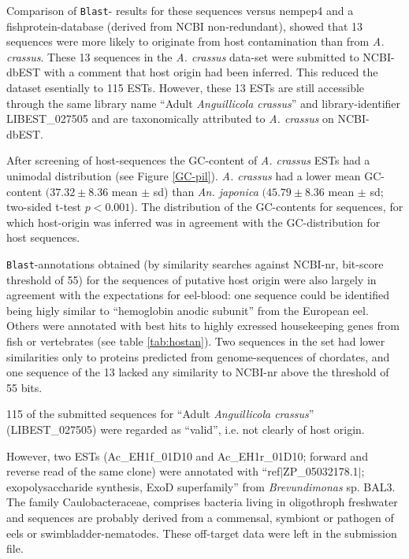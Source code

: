 Comparison of \texttt{Blast}- results for these sequences versus
nempep4 and a fishprotein-database (derived from NCBI non-redundant),
showed that 13 sequences were more likely to originate from host
contamination than from \textit{A. crassus}. These 13 sequences in the
\textit{A. crassus} data-set were submitted to NCBI-dbEST with a
comment that host origin had been inferred. This reduced the dataset
esentially to 115 ESTs. However, these 13 ESTs are still accessible
through the same library name ``Adult \textit{Anguillicola crassus}''
and library-identifier LIBEST\_027505 and are taxonomically attributed
to \textit{A. crassus} on NCBI-dbEST.


After screening of host-sequences the GC-content of
\textit{A. crassus} ESTs had a unimodal distribution (see Figure
\ref{GC-pil}). \textit{A. crassus} had a lower mean GC-content $(37.32
\pm 8.36$ mean $\pm$ sd) than \textit{An. japonica} $(45.79 \pm
8.36$ mean $\pm$ sd; two-sided t-test $p<0.001$). The distribution of
the GC-contents for sequences, for which host-origin was inferred was
in agreement with the GC-distribution for host sequences.

\texttt{Blast}-annotations obtained (by similarity searches against
NCBI-nr, bit-score threshold of 55) for the sequences of putative host
origin were also largely in agreement with the expectations for
eel-blood: one sequence could be identified being higly similar to
``hemoglobin anodic subunit'' from the European eel. Others were
annotated with best hits to highly exressed housekeeping genes from
fish or vertebrates (see table \ref{tab:hostan}). Two sequences in the
set had lower similarities only to proteins predicted from
genome-sequences of chordates, and one sequence of the 13 lacked any
similarity to NCBI-nr above the threshold of 55 bits.

115 of the submitted sequences for ``Adult \textit{Anguillicola
  crassus}'' (LIBEST\_027505) were regarded as ``valid'', i.e. not
clearly of host origin.

However, two ESTs (Ac\_EH1f\_01D10 and Ac\_EH1r\_01D10; forward and
reverse read of the same clone) were annotated with
``ref$|$ZP\_05032178.1$|$; exopolysaccharide synthesis, ExoD
superfamily'' from \textit{Brevundimonas} sp. BAL3. The family
Caulobacteraceae, comprises bacteria living in oligothroph freshwater
and sequences are probably derived from a commensal, symbiont or
pathogen of eels or swimbladder-nematodes. These off-target data were
left in the submission file.

